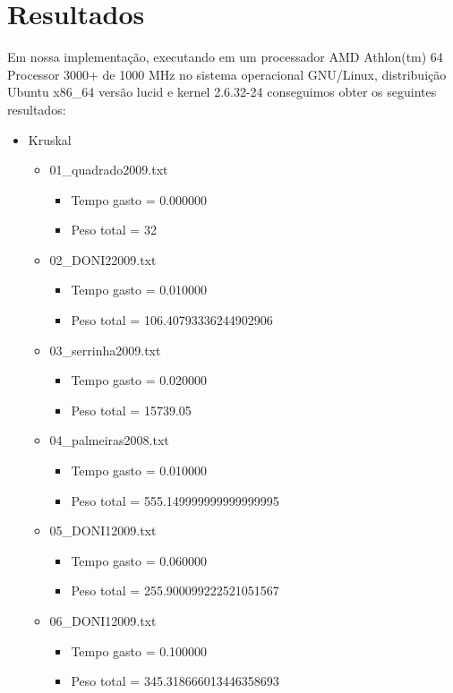\documentclass[12pt,a4paper]{article}
\begin{document}
\section{Resultados}

Em nossa implementação, executando em um processador AMD Athlon(tm) 64 Processor
3000+ de 1000 MHz no sistema operacional GNU/Linux, distribuição Ubuntu x86\_64
versão lucid e kernel 2.6.32-24 conseguimos obter os seguintes resultados:

\begin{itemize}
\item Kruskal
\begin{itemize}
\item 01\_quadrado2009.txt
\begin{itemize}
\item Tempo gasto = 0.000000 
\item Peso total = 32
\end{itemize}
\item 02\_DONI22009.txt
\begin{itemize}
\item Tempo gasto = 0.010000 
\item Peso total = 106.40793336244902906 
\end{itemize}
\item 03\_serrinha2009.txt
\begin{itemize}
\item Tempo gasto = 0.020000 
\item Peso total = 15739.05 
\end{itemize}
\item 04\_palmeiras2008.txt
\begin{itemize}
\item Tempo gasto = 0.010000 
\item Peso total = 555.149999999999999995 
\end{itemize}
\item 05\_DONI12009.txt
\begin{itemize}
\item Tempo gasto = 0.060000 
\item Peso total = 255.900099222521051567 
\end{itemize}
\item 06\_DONI12009.txt
\begin{itemize}
\item Tempo gasto = 0.100000 
\item Peso total = 345.318666013446358693 
\end{itemize}

\end{itemize}
\end{itemize}
\end{document}
